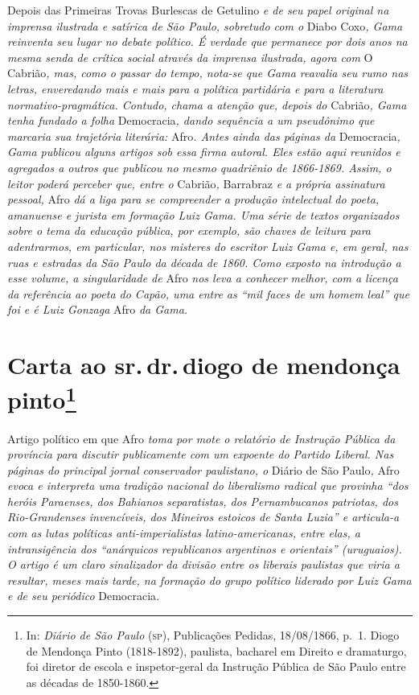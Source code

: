 \begin{argumento}
Depois das Primeiras Trovas Burlescas de Getulino \emph{e de seu papel
original na imprensa ilustrada e satírica de São Paulo, sobretudo com o}
Diabo Coxo\emph{, Gama reinventa seu lugar no debate político. É verdade
que permanece por dois anos na mesma senda de crítica social através da
imprensa ilustrada, agora com} O Cabrião\emph{, mas, como o passar do
tempo, nota-se que Gama reavalia seu rumo nas letras, enveredando mais e
mais para a política partidária e para a literatura
normativo-pragmática. Contudo, chama a atenção que, depois do}
Cabrião\emph{, Gama tenha fundado a folha} Democracia\emph{, dando
sequência a um pseudônimo que marcaria sua trajetória literária:}
Afro\emph{. Antes ainda das páginas da} Democracia\emph{, Gama publicou
alguns artigos sob essa firma autoral. Eles estão aqui reunidos e
agregados a outros que publicou no mesmo quadriênio de 1866-1869. Assim,
o leitor poderá perceber que, entre o} Cabrião\emph{,} Barrabraz \emph{e
a própria assinatura pessoal,} Afro \emph{dá a liga para se compreender
a produção intelectual do poeta, amanuense e jurista em formação Luiz
Gama. Uma série de textos organizados sobre o tema da educação pública,
por exemplo, são chaves de leitura para adentrarmos, em particular, nos
misteres do escritor Luiz Gama e, em geral, nas ruas e estradas da São
Paulo da década de 1860. Como exposto na introdução a esse volume, a
singularidade de} Afro \emph{nos leva a conhecer melhor, com a licença
da referência ao poeta do Capão, uma entre as ``mil faces de um homem
leal'' que foi e é Luiz Gonzaga} Afro \emph{da Gama.}
\end{argumento}

\chapter{Carta ao sr.\,dr.\,diogo de mendonça pinto\footnote{In: \emph{Diário
  de São Paulo} (\textsc{sp}), Publicações Pedidas, 18/08/1866, p.~1. Diogo de
  Mendonça Pinto (1818-1892), paulista, bacharel em Direito e
  dramaturgo, foi diretor de escola e inspetor-geral da Instrução
  Pública de São Paulo entre as décadas de 1850-1860.}}

\begin{didascalia}
Artigo político em que Afro \emph{toma por mote o relatório de
Instrução Pública da província para discutir publicamente com um
expoente do Partido Liberal. Nas páginas do principal jornal conservador
paulistano, o} Diário de São Paulo\emph{,} Afro \emph{evoca e interpreta
uma tradição nacional do liberalismo radical que provinha ``dos heróis
Paraenses, dos Bahianos separatistas, dos Pernambucanos patriotas, dos
Rio-Grandenses invencíveis, dos Mineiros estoicos de Santa Luzia'' e
articula-a com as lutas políticas anti-imperialistas latino-americanas,
entre elas, a intransigência dos ``anárquicos republicanos argentinos e
orientais'' (uruguaios). O artigo é um claro sinalizador da divisão entre
os liberais paulistas que viria a resultar, meses mais tarde, na
formação do grupo político liderado por Luiz Gama e de seu periódico}
Democracia\emph{.}
\end{didascalia}



